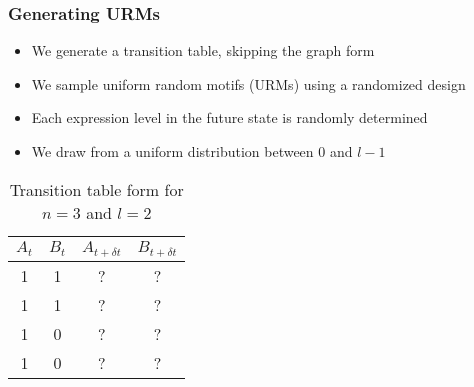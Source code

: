 \documentclass[hyperref={pdfpagelabels=false}]{beamer}
\begin{document}
\begin{frame}
\frametitle{Generating URMs}
\begin{itemize}
\item We generate a transition table, skipping the graph form
\item We sample uniform random motifs (URMs) using a randomized design
\item Each expression level in the future state is randomly determined
\item We draw from a uniform distribution between $0$ and $l-1$
\end{itemize}
\begin{table}[ht]
\begin{center}
\begin{tabular}{|c|c||c|c|}
\hline
$A_t$ & $B_t$ & $A_{t+\delta t}$ & $B_{t+\delta t}$ \\
\hline
\hline
1 & 1 & ? & ? \\
1 & 1 & ? & ? \\
1 & 0 & ? & ? \\
1 & 0 & ? & ? \\
\hline
\end{tabular}
\end{center}
\caption{Transition table form for $n=3$ and $l=2$}
\end{table}
\end{frame}
\end{document}
